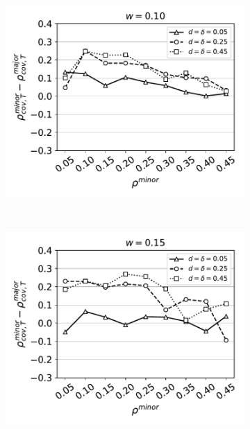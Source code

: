 \begin{figure}[H]
\begin{subfigure}{0.315\textwidth}
    \includegraphics[width=\textwidth]{Figures/full-minority-homophily=0p10.pdf}
  \end{subfigure} \\
  \begin{subfigure}{0.315\textwidth}
    \includegraphics[width=\textwidth]{Figures/full-minority-homophily=0p15.pdf}
  \end{subfigure}
  \begin{subfigure}{0.315\textwidth}

\end{subfigure}
\end{figure}
